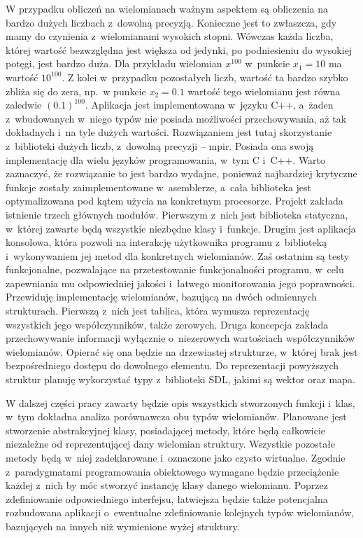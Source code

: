 W przypadku obliczeń na wielomianach ważnym aspektem są obliczenia na bardzo dużych liczbach z~dowolną precyzją. Konieczne jest to zwłaszcza, gdy mamy do czynienia z~wielomianami wysokich stopni. Wówczas każda liczba, której wartość bezwzględna jest większa od jedynki, po podniesieniu do wysokiej potęgi, jest bardzo duża. Dla przykładu wielomian $x^{100}$ w~punkcie $x_1=10$ ma wartość $10^{100}$. Z kolei w~przypadku pozostałych liczb, wartość ta bardzo szybko zbliża się do zera, np.\ w punkcie $x_2=0.1$ wartość tego wielomianu jest równa zaledwie $(0.1)^{100}$. Aplikacja jest implementowana w~języku C++, a~żaden z~wbudowanych w~niego typów nie posiada możliwości przechowywania, aż tak dokładnych i~na tyle dużych wartości. Rozwiązaniem jest tutaj skorzystanie z~biblioteki dużych liczb, z~dowolną precyzji – mpir. Posiada ona swoją implementację dla wielu języków programowania, w~tym C i~C++.  Warto zaznaczyć, że rozwiązanie to jest bardzo wydajne, ponieważ najbardziej krytyczne funkcje zostały zaimplementowane w~asemblerze, a~cała biblioteka jest optymalizowana pod kątem użycia na konkretnym procesorze.
Projekt zakłada istnienie trzech głównych modułów. Pierwszym z~nich jest biblioteka statyczna, w~której zawarte będą wszystkie niezbędne klasy i~funkcje. Drugim jest aplikacja konsolowa, która pozwoli na interakcję użytkownika programu z~biblioteką i~wykonywaniem jej metod dla konkretnych wielomianów. Zaś ostatnim są testy funkcjonalne, pozwalające na przetestowanie funkcjonalności programu, w~celu zapewniania mu odpowiedniej jakości i~łatwego monitorowania jego poprawności.
Przewiduję implementację wielomianów, bazującą na dwóch odmiennych strukturach. Pierwszą z~nich jest tablica, która wymusza reprezentację wszystkich jego współczynników, także zerowych. Druga koncepcja zakłada przechowywanie informacji wyłącznie o~niezerowych wartościach  współczynników wielomianów. Opierać się ona będzie na drzewiastej strukturze, w~której brak jest bezpośredniego dostępu do dowolnego elementu. Do reprezentacji powyższych struktur planuję wykorzystać typy z~biblioteki SDL, jakimi są wektor oraz mapa.

W dalszej części pracy zawarty będzie opis wszystkich stworzonych funkcji i~klas, w~tym dokładna analiza porównawcza obu typów wielomianów. Planowane jest stworzenie abstrakcyjnej klasy, posiadającej metody, które będą całkowicie niezależne od reprezentującej dany wielomian struktury. Wszystkie pozostałe metody będą w~niej zadeklarowane i~oznaczone jako czysto wirtualne. Zgodnie z~paradygmatami programowania obiektowego wymagane będzie przeciążenie każdej z~nich by móc stworzyć instancję klasy danego wielomianu. Poprzez zdefiniowanie odpowiedniego interfejsu, łatwiejsza będzie także potencjalna rozbudowana aplikacji o~ewentualne zdefiniowanie kolejnych typów wielomianów, bazujących na innych niż wymienione wyżej struktury.

